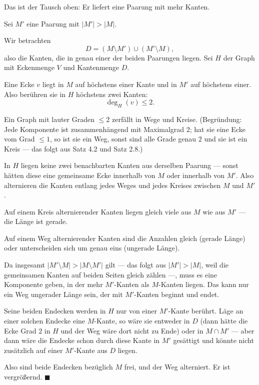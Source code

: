 \begin{merksatz}
Das ist der Tausch oben: Er liefert eine Paarung mit mehr Kanten.

Sei $M'$ eine Paarung mit $|M'| > |M|$.

Wir betrachten
\[ D = (M \setminus M') \cup (M' \setminus M) , \]
also die Kanten, die in genau einer der beiden Paarungen liegen. Sei $H$ der Graph mit Eckenmenge $V$ und Kantenmenge $D$.

Eine Ecke $v$ liegt in $M$ auf höchstens einer Kante und in $M'$ auf höchstens einer. Also berühren sie in $H$ höchstens zwei Kanten:
\[ \deg_H(v) \le 2 . \]

Ein Graph mit lauter Graden $\le 2$ zerfällt in Wege und Kreise. (Begründung: Jede Komponente ist zusammenhängend mit Maximalgrad $2$; hat sie eine Ecke vom Grad $\le 1$, so ist sie ein Weg, sonst sind alle Grade genau $2$ und sie ist ein Kreis --- das folgt aus Satz 4.2 und Satz 2.8.)

In $H$ liegen keine zwei benachbarten Kanten aus derselben Paarung --- sonst hätten diese eine gemeinsame Ecke innerhalb von $M$ oder innerhalb von $M'$. Also alternieren die Kanten entlang jedes Weges und jedes Kreises zwischen $M$ und $M'$.

Auf einem Kreis alternierender Kanten liegen gleich viele aus $M$ wie aus $M'$ --- die Länge ist gerade.

Auf einem Weg alternierender Kanten sind die Anzahlen gleich (gerade Länge) oder unterscheiden sich um genau eins (ungerade Länge).

Da insgesamt $|M' \setminus M| > |M \setminus M'|$ gilt --- das folgt aus $|M'| > |M|$, weil die gemeinsamen Kanten auf beiden Seiten gleich zählen ---, muss es eine Komponente geben, in der mehr $M'$-Kanten als $M$-Kanten liegen. Das kann nur ein Weg ungerader Länge sein, der mit $M'$-Kanten beginnt und endet.

Seine beiden Endecken werden in $H$ nur von einer $M'$-Kante berührt. Läge an einer solchen Endecke eine $M$-Kante, so wäre sie entweder in $D$ (dann hätte die Ecke Grad $2$ in $H$ und der Weg wäre dort nicht zu Ende) oder in $M \cap M'$ --- aber dann wäre die Endecke schon durch diese Kante in $M'$ gesättigt und könnte nicht zusätzlich auf einer $M'$-Kante aus $D$ liegen.

Also sind beide Endecken bezüglich $M$ frei, und der Weg alterniert. Er ist vergrößernd. $\blacksquare$
\end{merksatz}

